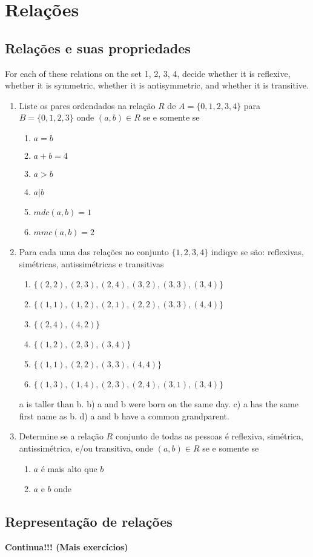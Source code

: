 \chapter*{Relações}

\section*{Relações e suas propriedades}

For each of these relations on the set {1, 2, 3, 4}, decide
whether it is reflexive, whether it is symmetric, whether
it is antisymmetric, and whether it is transitive.

\begin{enumerate}
  	\item {Liste os pares ordendados na relação $R$ de $A = \{0,1,2,3,4\}$ para $B = \{0,1,2,3\}$ onde $(a,b) \in R$ se
  	e somente se}
  	\begin{enumerate}
  	  	\item $a = b$ \item $a + b = 4$ \item $a > b$ \item $a | b$ \item $mdc(a,b)=1$ \item $mmc(a,b)=2$
  	\end{enumerate}
  	
  	\item{Para cada uma das relações no conjunto $\{1,2,3,4\}$ indiqye se são: reflexivas, simétricas, antissimétricas
  	e transitivas}
  	\begin{enumerate}
  	  	\item $\{(2, 2), (2, 3), (2, 4), (3, 2), (3, 3), (3, 4)\}$
  	  	\item $\{(1, 1), (1, 2), (2, 1), (2, 2), (3, 3), (4, 4)\}$
  	  	\item $\{(2, 4), (4, 2)\}$
  	  	\item $\{(1, 2), (2, 3), (3, 4)\}$
  	  	\item $\{(1, 1), (2, 2), (3, 3), (4, 4)\}$
  	  	\item $\{(1, 3), (1, 4), (2, 3), (2, 4), (3, 1), (3, 4)\}$
  	\end{enumerate}
 a is taller than b.
b) a and b were born on the same day.
c) a has the same first name as b.
d) a and b have a common grandparent.

  	\item {Determine se a relação $R$ conjunto de todas as pessoas é reflexiva, simétrica, antissimétrica, e/ou
  	transitiva, onde $(a,b) \in R$ se e somente se}
  	\begin{enumerate}
  		\item $a$ é mais alto que $b$ \item $a$ e $b$ onde 
  	\end{enumerate}	
\end{enumerate}

\section*{Representação de relações}

\begin{enumerate}
  	
\end{enumerate}

\vspace*{2em}
\begin{center}\textbf{Continua!!! (Mais exercícios)}\end{center}